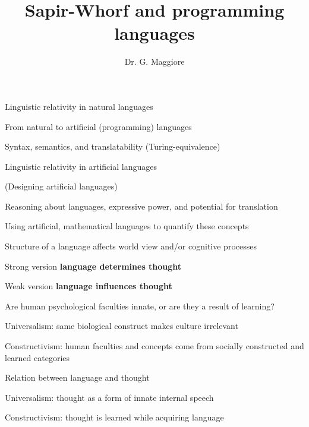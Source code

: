 \documentclass{beamer}
\title{Sapir-Whorf and programming languages}
\author{Dr. G. Maggiore}
\institute{Hogeschool Rotterdam \\ 
Rotterdam, Netherlands}
\date{}
\begin{document}
\maketitle

\begin{slide}{
\item Linguistic relativity in natural languages
\item From natural to artificial (programming) languages
\item Syntax, semantics, and translatability (Turing-equivalence)
\item Linguistic relativity in artificial languages
\item (Designing artificial languages)
}\end{slide}

\begin{slide}{
\item Reasoning about languages, expressive power, and potential for translation
\item Using artificial, mathematical languages to quantify these concepts
}\end{slide}

\begin{slide}{
\item Structure of a language affects world view and/or cognitive processes
\item Strong version \textbf{language determines thought}
\item Weak version \textbf{language influences thought}
}\end{slide}

\begin{slide}{
\item Are human psychological faculties innate, or are they a result of learning?
\item Universalism: same biological construct makes culture irrelevant
\item Constructivism: human faculties and concepts come from socially constructed and learned categories
}\end{slide}

\begin{slide}{
\item Relation between language and thought
\item Universalism: thought as a form of innate internal speech
\item Constructivism: thought is learned while acquiring language
}\end{slide}
\end{document}
